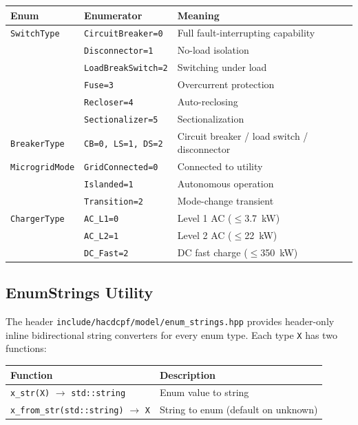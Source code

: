 \begin{center}
\begin{tabular}{lll}
\hline\hline
\textbf{Enum} & \textbf{Enumerator} & \textbf{Meaning} \\
\hline
\texttt{SwitchType} & \texttt{CircuitBreaker=0} & Full fault-interrupting capability \\
 & \texttt{Disconnector=1} & No-load isolation \\
 & \texttt{LoadBreakSwitch=2} & Switching under load \\
 & \texttt{Fuse=3} & Overcurrent protection \\
 & \texttt{Recloser=4} & Auto-reclosing \\
 & \texttt{Sectionalizer=5} & Sectionalization \\
\hline
\texttt{BreakerType} & \texttt{CB=0, LS=1, DS=2} & Circuit breaker / load switch / disconnector \\
\hline
\texttt{MicrogridMode} & \texttt{GridConnected=0} & Connected to utility \\
 & \texttt{Islanded=1} & Autonomous operation \\
 & \texttt{Transition=2} & Mode-change transient \\
\hline
\texttt{ChargerType} & \texttt{AC\_L1=0} & Level 1 AC (\(\leq\)3.7~kW) \\
 & \texttt{AC\_L2=1} & Level 2 AC (\(\leq\)22~kW) \\
 & \texttt{DC\_Fast=2} & DC fast charge (\(\leq\)350~kW) \\
\hline\hline
\end{tabular}
\end{center}

\subsection{EnumStrings Utility}
\label{sec:enum-strings}

The header \texttt{include/hacdcpf/model/enum\_strings.hpp} provides
header-only inline bidirectional string converters for every enum type.
Each type \texttt{X} has two functions:

\begin{center}
\begin{tabular}{ll}
\hline\hline
\textbf{Function} & \textbf{Description} \\
\hline
\texttt{x\_str(X)} $\to$ \texttt{std::string} & Enum value to string \\
\texttt{x\_from\_str(std::string)} $\to$ \texttt{X} & String to enum (default on unknown) \\
\hline\hline
\end{tabular}
\end{center}

